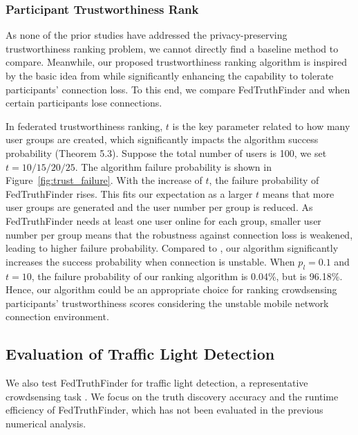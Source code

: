 \subsubsection{Participant Trustworthiness Rank}

As none of the prior studies have addressed the privacy-preserving trustworthiness ranking problem, we cannot directly find a baseline method to compare. Meanwhile, our proposed trustworthiness ranking algorithm is inspired by the basic idea from \citet{tang2011secure} while significantly enhancing the capability to tolerate participants' connection loss. To this end, we compare FedTruthFinder and \citet{tang2011secure} when certain participants lose connections. 

In federated trustworthiness ranking, $t$ is the key parameter related to how many user groups are created, which significantly impacts the algorithm success probability (Theorem 5.3). Suppose the total number of users is 100, we set $t=10/15/20/25$. The algorithm failure probability is shown in Figure~\ref{fig:trust_failure}. With the increase of $t$, the failure probability of FedTruthFinder rises. This fits our expectation as a larger $t$ means that more user groups are generated and the user number per group is reduced. As FedTruthFinder needs at least one user online for each group, smaller user number per group means that the robustness against connection loss is weakened, leading to higher failure probability. Compared to \citet{tang2011secure}, our algorithm significantly increases the success probability when connection is unstable. When $p_l = 0.1$ and $t=10$, the failure probability of our ranking algorithm is 0.04\%, but \citet{tang2011secure} is 96.18\%. 
Hence, our algorithm could be an appropriate choice for ranking crowdsensing participants' trustworthiness scores considering the unstable mobile network connection environment.



\subsection{Evaluation of Traffic Light Detection}

We also test FedTruthFinder for traffic light detection, a representative crowdsensing task \citep{ouyang2015truth,wang2013credibility}. We focus on the truth discovery accuracy and the runtime efficiency of FedTruthFinder, which has not been evaluated in the previous numerical analysis.


